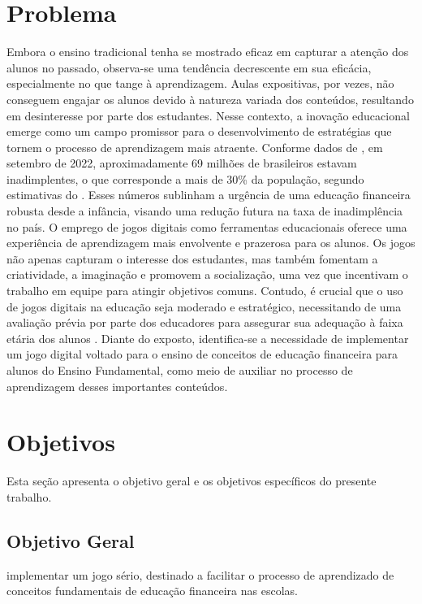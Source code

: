 \section{Problema}
Embora o ensino tradicional tenha se mostrado eficaz em capturar a atenção dos alunos no passado, observa-se uma tendência decrescente em sua eficácia, especialmente no que tange à aprendizagem. Aulas expositivas, por vezes, não conseguem engajar os alunos devido à natureza variada dos conteúdos, resultando em desinteresse por parte dos estudantes. Nesse contexto, a inovação educacional emerge como um campo promissor para o desenvolvimento de estratégias que tornem o processo de aprendizagem mais atraente.
Conforme dados de , em setembro de 2022, aproximadamente 69 milhões de brasileiros estavam inadimplentes, o que corresponde a mais de 30\% da população, segundo estimativas do \cite{IBGE_populacao}. Esses números sublinham a urgência de uma educação financeira robusta desde a infância, visando uma redução futura na taxa de inadimplência no país.
O emprego de jogos digitais como ferramentas educacionais oferece uma experiência de aprendizagem mais envolvente e prazerosa para os alunos. Os jogos não apenas capturam o interesse dos estudantes, mas também fomentam a criatividade, a imaginação e promovem a socialização, uma vez que incentivam o trabalho em equipe para atingir objetivos comuns. Contudo, é crucial que o uso de jogos digitais na educação seja moderado e estratégico, necessitando de uma avaliação prévia por parte dos educadores para assegurar sua adequação à faixa etária dos alunos \cite{Cruz_Araujo_Andrye_Galvao_Madeira_2022}.
Diante do exposto, identifica-se a necessidade de implementar um jogo digital voltado para o ensino de conceitos de educação financeira para alunos do Ensino Fundamental, como meio de auxiliar no processo de aprendizagem desses importantes conteúdos.

\section{Objetivos}
Esta seção apresenta o objetivo geral e os objetivos específicos do presente trabalho.

\subsection{Objetivo Geral}
implementar um jogo sério, destinado a facilitar o processo de aprendizado de conceitos fundamentais de educação financeira nas escolas. 

